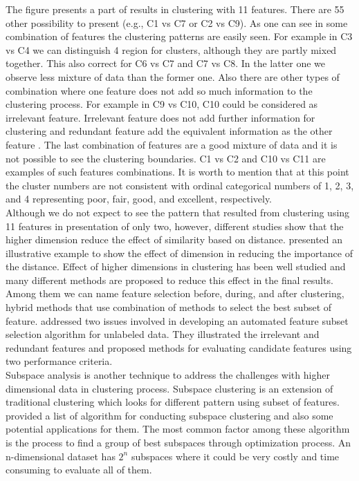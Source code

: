 The figure presents a part of results in clustering with 11 features. There are 55 other possibility to present (e.g., C1 vs C7 or C2 vs C9). As one can see in some combination of features the clustering patterns are easily seen. For example in C3 vs C4 we can distinguish 4 region for clusters, although they are partly mixed together. This also correct for C6 vs C7 and C7 vs C8. In the latter one we observe less mixture of data than the former one. Also there are other types of combination where one feature does not add so much information to the clustering process. For example in C9 vs C10, C10 could be considered as irrelevant feature. Irrelevant feature does not add further information for clustering and redundant feature add the equivalent information as the other feature \citep{Dy_2004_MLR}. The last combination of features are a good mixture of data and it is not possible to see the clustering boundaries. C1 vs C2 and C10 vs C11 are examples of such features combinations. It is worth to mention that at this point the cluster numbers are not consistent with ordinal categorical numbers of 1, 2, 3, and 4 representing poor, fair, good, and excellent, respectively.\\   
Although we do not expect to see the pattern that resulted from clustering using 11 features in presentation of only two, however, different studies show that the higher dimension reduce the effect of similarity based on distance. \citet{Parsons_2004_ACM} presented an illustrative example to show the effect of dimension in reducing the importance of the distance. Effect of higher dimensions in clustering has been well studied and many different methods are proposed to reduce this effect in the final results. Among them we can name  feature selection before, during, and after clustering, hybrid methods that use combination of methods to select the best subset of feature. \citet{Dy_2004_MLR} addressed two issues involved in developing an automated feature subset selection algorithm for unlabeled data. They illustrated the irrelevant and redundant features and proposed methods for evaluating candidate features using two performance criteria. \\
Subspace analysis is another technique to address the challenges with higher dimensional data in clustering process. Subspace clustering is an extension of traditional clustering which looks for different pattern using subset of features.  \citet{Parsons_2004_ACM} provided a list of algorithm for conducting subspace clustering and also some potential applications for them. The most common factor among these algorithm is the process to find a group of best subspaces through optimization process. An n-dimensional dataset has $2^n$ subspaces where it could be very costly and time consuming to evaluate all of them.\\
